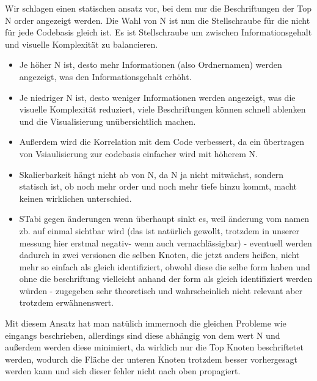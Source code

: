 Wir schlagen einen statischen ansatz vor, bei dem nur die Beschriftungen der Top N order angezeigt werden. 
Die Wahl von N ist nun die Stellschraube für die nicht für jede Codebasis gleich ist. Es ist Stellschraube um zwischen Informationsgehalt und visuelle Komplexität zu balancieren.
\begin{itemize}
    \item Je höher N ist, desto mehr Informationen (also Ordnernamen) werden angezeigt, was den Informationsgehalt erhöht.
\item Je niedriger N ist, desto weniger Informationen werden angezeigt, was die visuelle Komplexität reduziert, viele Beschriftungen können schnell ablenken und die Visualisierung unübersichtlich machen.
\item Außerdem wird die Korrelation mit dem Code verbessert, da ein übertragen von Vsiaulisierung zur codebasis einfacher wird mit höherem N.
\item Skalierbarkeit hängt nicht ab von N, da N ja nicht mitwächst, sondern statisch ist, ob noch mehr order und noch mehr tiefe hinzu kommt, macht keinen wirklichen unterschied.
\item STabi gegen änderungen wenn überhaupt sinkt es, weil änderung vom namen zb. auf einmal sichtbar wird (das ist natürlich gewollt, trotzdem in unserer messung hier erstmal negativ- wenn auch vernachlässigbar) - eventuell werden dadurch in zwei versionen die selben Knoten, die jetzt anders heißen, nicht mehr so einfach als gleich identifiziert, obwohl diese die selbe form haben und ohne die beschriftung vielleicht anhand der form als gleich identifiziert werden würden - zugegeben sehr theoretisch und wahrscheinlich nicht relevant aber trotzdem erwähnenswert.
\end{itemize}
Mit diesem Ansatz hat man natülich immernoch die gleichen Probleme wie eingangs beschrieben, allerdings sind diese abhängig von dem wert N und außerdem werden diese minimiert, da wirklich nur die Top Knoten beschriftetet werden, wodurch die Fläche der unteren Knoten trotzdem besser vorhergesagt werden kann und sich dieser fehler nicht nach oben propagiert.


